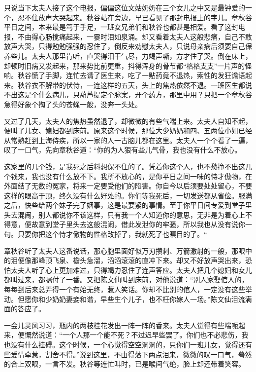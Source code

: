 \documentclass[12pt,UTF8]{ctexbook}
\begin{document}
{{{只说当下太夫人接了这个电报，偏偏这位文姑奶奶在三个女儿之中又是最钟爱的一个，忍不住放声大哭起来。秋谷站在旁边，早已看见了那封电报上的字儿。章秋谷平日之间，本来最是笃于手足，一班女兄弟们和秋谷也都甚是相爱。看了这封电报，不由得心肠搅痛起来，一霎时泪如泉涌。却又看着太夫人这般悲痛，自己不敢放声大哭，只得勉勉强强的忍住了，倒反来劝慰太夫人，只说母亲病后须要自己保养些儿。太夫人那里肯听，直哭得泪干气尽，力竭声嘶，方才住了哭。倒在床上，却顿时旧病又发起来，那来势比前更重，抖得浑身的骨节都“格格支支”一片声的怪响。秋谷慌了手脚，连忙去请了医生来，吃了一贴药竟不退热，索性的发狂谵语起来。秋谷衣不解带的伏侍，一连这样的五天，头上的焦热依然不退。一班医生都说不出这是个什么病儿，只葫芦提定个脉案，开个药方，那里中用？只把一个章秋谷急得好象个掏了头的苍蝇一般，没奔一头处。

又过了几天，太夫人的焦热虽然退了，却微微的有些气喘上来。太夫人自知不起，便叫了儿女、媳妇都到床前。原来这个时候，那位大少奶奶和四、五两位小姐已经从常熟赶到上海侍疾，所以一家的人一古脑儿都在这里。太夫人一个个看了一遍，叹了一口气，先向章秋谷道：“你的为人狠有些儿气骨，我也没有什么不放心。

这家里的几个钱，是我死之后料想保不住的了。凭着你这个人，也不愁挣不出这几个钱来，我也没有什么放不下。我所不放心的，是你平日之间一味的恃才傲物，在外面结了无数的冤家，将来一定要受他们的陷害。你自今以后须要处处留心，不要这样的眼高于顶，终久没有什么好处的。你们等我死后，一切发送都从省俭。服满之后，快些给两个妹子完了姻事，这是最要紧的事情。至于你平日间专爱到堂子里头去混闹，别人都说你不该这样，只有我一个人知道你的意思，无非是为着心上不得意，便故意到堂子里头去这般混闹，借此发泄你的牢骚，所以我也从没有说你一句。只要你把这个恃才傲物的性格改掉了，我就死了也瞑目的了。“

章秋谷听了太夫人这番说话，那心胞里面好似万刃攒刺、万箭激射的一般，那眼中的泪便像那峰顶飞泉、檐头急溜，滔滔滚滚的直冲下来。却又不好放声哭出来，恐怕太夫人听了心上更加难过，只得竭力忍住了连声答应。太夫人把几个媳妇和女儿都叫过来，都嘱付了一番。又把陈文仙叫到床前，对他说道：“别人家娶倌人的，每每到后来总弄得一个有始无终，惹人笑话。你却不比别的倌人，一定没有这些举动。但愿你和少奶奶妻妾和谐，早些生个儿子，也不枉你嫁人一场。”陈文仙泪流满面的答应了。

一会儿灵风习习，瓶内的两枝桂花发出一阵一阵的香来。太夫人觉得有些喘呃起来，便慨然说道：“一个人那一个能不死？不过迟早些罢了。你们也不必悲伤，我也没有什么挂碍。这个时候，一个心觉得空空洞洞的，只你们一班儿女，觉得还有些爱情牵惹，割舍不得。”说到这里，不由得落下两点泪来，微微的叹一口气，蓦然的合上双眼，一言不发。秋谷等连忙叫时，已是喉间气绝，脸上却还带着笑容。

}}}
\end{document}
